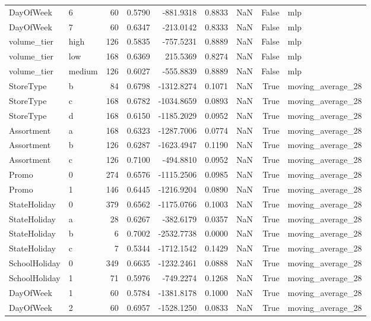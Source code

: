 \begin{table}
\begin{tabular}{llrrrrrrl}
DayOfWeek & 6 & 60 & 0.5790 & -881.9318 & 0.8833 & NaN & False & mlp \\
DayOfWeek & 7 & 60 & 0.6347 & -213.0142 & 0.8333 & NaN & False & mlp \\
volume\_tier & high & 126 & 0.5835 & -757.5231 & 0.8889 & NaN & False & mlp \\
volume\_tier & low & 168 & 0.6369 & 215.5369 & 0.8274 & NaN & False & mlp \\
volume\_tier & medium & 126 & 0.6027 & -555.8839 & 0.8889 & NaN & False & mlp \\
StoreType & b & 84 & 0.6798 & -1312.8274 & 0.1071 & NaN & True & moving\_average\_28 \\
StoreType & c & 168 & 0.6782 & -1034.8659 & 0.0893 & NaN & True & moving\_average\_28 \\
StoreType & d & 168 & 0.6150 & -1185.2029 & 0.0952 & NaN & True & moving\_average\_28 \\
Assortment & a & 168 & 0.6323 & -1287.7006 & 0.0774 & NaN & True & moving\_average\_28 \\
Assortment & b & 126 & 0.6287 & -1623.4947 & 0.1190 & NaN & True & moving\_average\_28 \\
Assortment & c & 126 & 0.7100 & -494.8810 & 0.0952 & NaN & True & moving\_average\_28 \\
Promo & 0 & 274 & 0.6576 & -1115.2506 & 0.0985 & NaN & True & moving\_average\_28 \\
Promo & 1 & 146 & 0.6445 & -1216.9204 & 0.0890 & NaN & True & moving\_average\_28 \\
StateHoliday & 0 & 379 & 0.6562 & -1175.0766 & 0.1003 & NaN & True & moving\_average\_28 \\
StateHoliday & a & 28 & 0.6267 & -382.6179 & 0.0357 & NaN & True & moving\_average\_28 \\
StateHoliday & b & 6 & 0.7002 & -2532.7738 & 0.0000 & NaN & True & moving\_average\_28 \\
StateHoliday & c & 7 & 0.5344 & -1712.1542 & 0.1429 & NaN & True & moving\_average\_28 \\
SchoolHoliday & 0 & 349 & 0.6635 & -1232.2461 & 0.0888 & NaN & True & moving\_average\_28 \\
SchoolHoliday & 1 & 71 & 0.5976 & -749.2274 & 0.1268 & NaN & True & moving\_average\_28 \\
DayOfWeek & 1 & 60 & 0.5784 & -1381.8178 & 0.1000 & NaN & True & moving\_average\_28 \\
DayOfWeek & 2 & 60 & 0.6957 & -1528.1250 & 0.0833 & NaN & True & moving\_average\_28 \\

\end{tabular}
\end{table}
